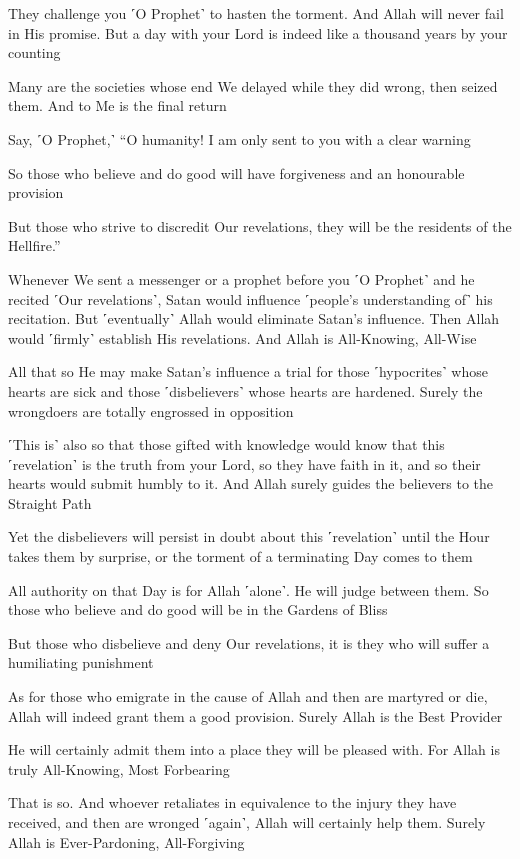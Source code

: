 They challenge you ˹O Prophet˺ to hasten the torment. And Allah will never fail in His promise. But a day with your Lord is indeed like a thousand years by your counting

Many are the societies whose end We delayed while they did wrong, then seized them. And to Me is the final return

Say, ˹O Prophet,˺ “O humanity! I am only sent to you with a clear warning

So those who believe and do good will have forgiveness and an honourable provision

But those who strive to discredit Our revelations, they will be the residents of the Hellfire.”

Whenever We sent a messenger or a prophet before you ˹O Prophet˺ and he recited ˹Our revelations˺, Satan would influence ˹people’s understanding of˺ his recitation. But ˹eventually˺ Allah would eliminate Satan’s influence. Then Allah would ˹firmly˺ establish His revelations. And Allah is All-Knowing, All-Wise

All that so He may make Satan’s influence a trial for those ˹hypocrites˺ whose hearts are sick and those ˹disbelievers˺ whose hearts are hardened. Surely the wrongdoers are totally engrossed in opposition

˹This is˺ also so that those gifted with knowledge would know that this ˹revelation˺ is the truth from your Lord, so they have faith in it, and so their hearts would submit humbly to it. And Allah surely guides the believers to the Straight Path

Yet the disbelievers will persist in doubt about this ˹revelation˺ until the Hour takes them by surprise, or the torment of a terminating Day comes to them

All authority on that Day is for Allah ˹alone˺. He will judge between them. So those who believe and do good will be in the Gardens of Bliss

But those who disbelieve and deny Our revelations, it is they who will suffer a humiliating punishment

As for those who emigrate in the cause of Allah and then are martyred or die, Allah will indeed grant them a good provision. Surely Allah is the Best Provider

He will certainly admit them into a place they will be pleased with. For Allah is truly All-Knowing, Most Forbearing

That is so. And whoever retaliates in equivalence to the injury they have received, and then are wronged ˹again˺, Allah will certainly help them. Surely Allah is Ever-Pardoning, All-Forgiving

